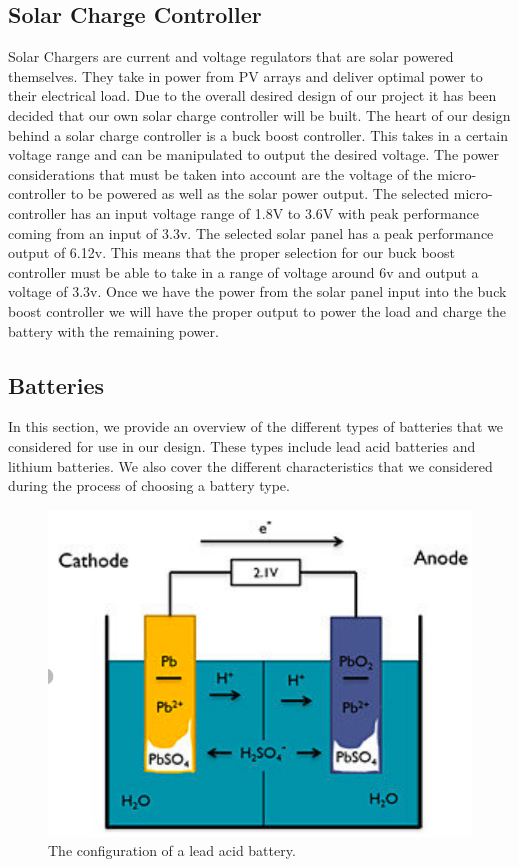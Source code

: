 \subsection{Solar Charge Controller}
Solar Chargers are current and voltage regulators that are solar powered themselves. They take in power from PV arrays and deliver optimal power to their electrical load. Due to the overall desired design of our project it has been decided that our own solar charge controller will be built. The heart of our design behind a solar charge controller is a buck boost controller. This takes in a certain voltage range and can be manipulated to output the desired voltage. The power considerations that must be taken into account are the voltage of the micro-controller to be powered as well as the solar power output. The selected micro-controller has an input voltage range of 1.8V to 3.6V with peak performance coming from an input of 3.3v. The selected solar panel has a peak performance output of 6.12v. This means that the proper selection for our buck boost controller must be able to take in a range of voltage around 6v and output a voltage of 3.3v. Once we have the power from the solar panel input into the buck boost controller we will have the proper output to power the load and charge the battery with the remaining power.

\subsection{Batteries}
In this section, we provide an overview of the different types of batteries that we considered for use in our design. These types include lead acid batteries and lithium batteries. We also cover the different characteristics that we considered during the process of choosing a battery type.

\begin{figure}
    \centering
    \includegraphics[scale=0.25]{figures/lead-acid-battery.png}
    \caption{The configuration of a lead acid battery.}
    \label{lead-acid-battery} 
\end{figure}

